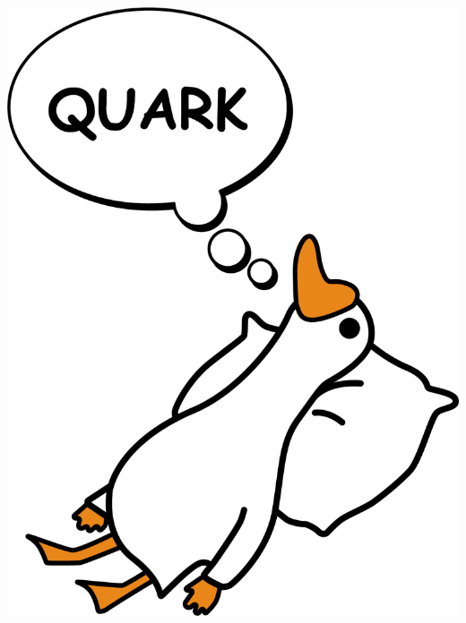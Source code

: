 \documentclass[22pt,margin=0.5in,innermargin=-4.5in,blockverticalspace=-0.5in]{tikzposter}
\begin{document}
\begin{columns}
{\begin{center}
\includegraphics[scale=1.11]{Figures/DreamingDuck.png}

\end{center}}
\end{columns}
\end{document}
